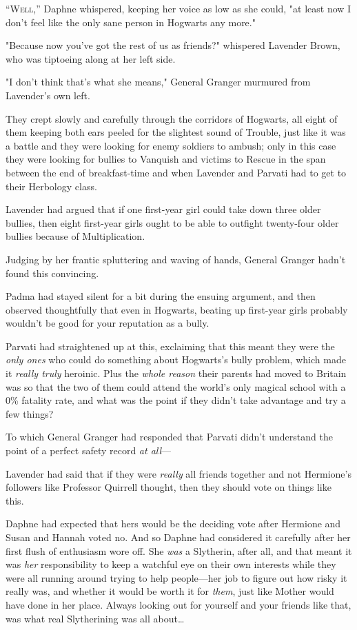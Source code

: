 
\lettrine{“W}{ell},” Daphne
whispered, keeping her voice as low as she could, "at least now I don't feel
like the only sane person in Hogwarts any more."

"Because now you've got the rest of us as friends?" whispered Lavender Brown,
who was tiptoeing along at her left side.

"I don't think that's what she means," General Granger murmured from Lavender's
own left.

They crept slowly and carefully through the corridors of Hogwarts, all eight of
them keeping both ears peeled for the slightest sound of Trouble, just like it
was a battle and they were looking for enemy soldiers to ambush; only in this
case they were looking for bullies to Vanquish and victims to Rescue in the
span between the end of breakfast-time and when Lavender and Parvati had to get
to their Herbology class.

Lavender had argued that if one first-year girl could take down three older
bullies, then eight first-year girls ought to be able to outfight twenty-four
older bullies because of Multiplication.

Judging by her frantic spluttering and waving of hands, General Granger hadn't
found this convincing.

Padma had stayed silent for a bit during the ensuing argument, and then
observed thoughtfully that even in Hogwarts, beating up first-year girls
probably wouldn't be good for your reputation as a bully.

Parvati had straightened up at this, exclaiming that this meant they were the
\emph{only ones} who could do something about Hogwarts's bully problem, which
made it \emph{really truly} heroinic. Plus the \emph{whole reason} their
parents had moved to Britain was so that the two of them could attend the
world's only magical school with a 0\% fatality rate, and what was the point if
they didn't take advantage and try a few things?

To which General Granger had responded that Parvati didn't understand the point
of a perfect safety record \emph{at all}—

Lavender had said that if they were \emph{really} all friends together and not
Hermione's followers like Professor Quirrell thought, then they should vote on
things like this.

Daphne had expected that hers would be the deciding vote after Hermione and
Susan and Hannah voted no. And so Daphne had considered it carefully after her
first flush of enthusiasm wore off. She \emph{was} a Slytherin, after all, and
that meant it was \emph{her} responsibility to keep a watchful eye on their own
interests while they were all running around trying to help people—her job to
figure out how risky it really was, and whether it would be worth it for
\emph{them}, just like Mother would have done in her place. Always looking out
for yourself and your friends like that, was what real Slytherining was all
about…

